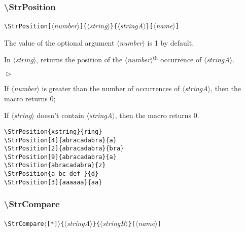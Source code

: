 \documentclass[a4paper,10pt]{article}
\newcommand\argu[1]{$\langle$\textit{#1}$\rangle$}
\newcommand\ARGU[1]{\texttt{\{}\argu{#1}\texttt{\}}}
\newcommand\arguC[1]{\texttt{[}\argu{#1}\texttt{]}}
\newcommand\etoile{$\langle$\texttt{[*]}$\rangle$}
\newenvironment{Conditions}[1][1cm]%
{\begin{list}%
	{$\vartriangleright$}%
	{\setlength{\leftmargin}{#1}
	 \setlength{\itemsep}{0pt}
	 \setlength{\parsep}{0pt}
	 \setlength{\topsep}{2ptplus3ptminus2pt}
	}}%
{\end{list}}
\renewcommand\th{${}^\text{th}$\xspace}
\newcommand\styleexemple{\small\vskip4pt}
\newcommand\verbinline{\lstinline[basicstyle=\normalsize\ttfamily]}
\begin{document}
\subsubsection{\ttfamily\textbackslash StrPosition}

\verbinline|\StrPosition|\arguC{number}\ARGU{string}\ARGU{stringA}\arguC{name}
\smallskip

The value of the optional argument \argu{number} is 1 by default.\par\smallskip

In \argu{string}, returns the position of the \argu{number}\th occurrence of \argu{stringA}.\medskip

\begin{Conditions}
\item If \argu{number} is greater than the number of occurrences of \argu{stringA}, then the macro returns 0;
\item If \argu{string} doesn't contain \argu{stringA}, then the macro returns 0.
\end{Conditions}
\medskip

\begin{minipage}[t]{0.65\linewidth}
\begin{lstlisting}
\StrPosition{xstring}{ring}
\StrPosition[4]{abracadabra}{a}
\StrPosition[2]{abracadabra}{bra}
\StrPosition[9]{abracadabra}{a}
\StrPosition{abracadabra}{z}
\StrPosition{a bc def }{d}
\StrPosition[3]{aaaaaa}{aa}
\end{lstlisting}%
\end{minipage}\hfill
\begin{minipage}[t]{0.35\linewidth}
	\styleexemple
	\par
	\par
	\par
	\par
	\par
	\par
\end{minipage}%

\subsubsection{\ttfamily\textbackslash StrCompare}
\verbinline|\StrCompare|\etoile\ARGU{stringA}\ARGU{stringB}\arguC{name}
\smallskip
\end{document}
